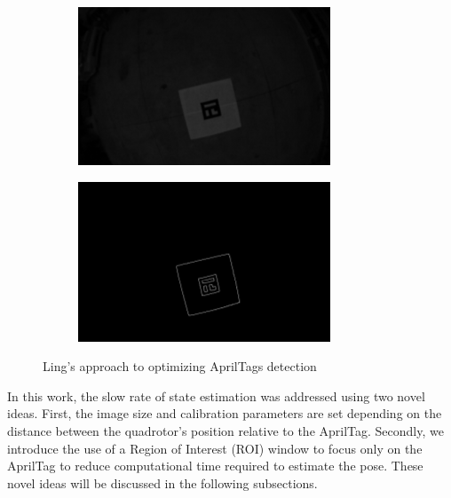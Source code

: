 \documentclass[11pt, twocolumn]{article}
\begin{document}
\begin{figure}[H]
	\centering
	\begin{subfigure}[b]{0.45\linewidth}
		\includegraphics[width=\textwidth]{images/ling_apriltags_1.png}
	\end{subfigure}
	\begin{subfigure}[b]{0.45\linewidth}
		\includegraphics[width=\textwidth]{images/ling_apriltags_2.png}
	\end{subfigure}
	\caption{Ling's approach to optimizing AprilTags detection \cite{Ling2014}}
	\label{fig:ling_apriltags}
	\vspace{-0.4cm}
\end{figure}

In this work, the slow rate of state estimation was addressed using two novel ideas. First, the image size and calibration parameters are set depending on the distance between the quadrotor's position relative to the AprilTag. Secondly, we introduce the use of a Region of Interest (ROI) window to focus only on the AprilTag to reduce computational time required to estimate the pose. These novel ideas will be discussed in the following subsections.
\end{document}
